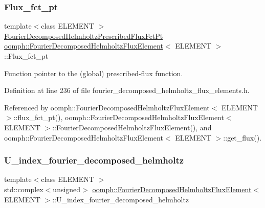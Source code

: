 \subsubsection{\texorpdfstring{Flux\+\_\+fct\+\_\+pt}{Flux\_fct\_pt}}
{\footnotesize\ttfamily template$<$class E\+L\+E\+M\+E\+NT $>$ \\
\hyperlink{classoomph_1_1FourierDecomposedHelmholtzFluxElement_af230a2a3a16a1fd0a48a2681dc94c1e8}{Fourier\+Decomposed\+Helmholtz\+Prescribed\+Flux\+Fct\+Pt} \hyperlink{classoomph_1_1FourierDecomposedHelmholtzFluxElement}{oomph\+::\+Fourier\+Decomposed\+Helmholtz\+Flux\+Element}$<$ E\+L\+E\+M\+E\+NT $>$\+::Flux\+\_\+fct\+\_\+pt\hspace{0.3cm}{\ttfamily [protected]}}



Function pointer to the (global) prescribed-\/flux function. 



Definition at line 236 of file fourier\+\_\+decomposed\+\_\+helmholtz\+\_\+flux\+\_\+elements.\+h.



Referenced by oomph\+::\+Fourier\+Decomposed\+Helmholtz\+Flux\+Element$<$ E\+L\+E\+M\+E\+N\+T $>$\+::flux\+\_\+fct\+\_\+pt(), oomph\+::\+Fourier\+Decomposed\+Helmholtz\+Flux\+Element$<$ E\+L\+E\+M\+E\+N\+T $>$\+::\+Fourier\+Decomposed\+Helmholtz\+Flux\+Element(), and oomph\+::\+Fourier\+Decomposed\+Helmholtz\+Flux\+Element$<$ E\+L\+E\+M\+E\+N\+T $>$\+::get\+\_\+flux().

\mbox{\label{classoomph_1_1FourierDecomposedHelmholtzFluxElement_ad4145847e04e141392e48b217ddb9125}} 
\subsubsection{\texorpdfstring{U\+\_\+index\+\_\+fourier\+\_\+decomposed\+\_\+helmholtz}{U\_index\_fourier\_decomposed\_helmholtz}}
{\footnotesize\ttfamily template$<$class E\+L\+E\+M\+E\+NT $>$ \\
std\+::complex$<$unsigned$>$ \hyperlink{classoomph_1_1FourierDecomposedHelmholtzFluxElement}{oomph\+::\+Fourier\+Decomposed\+Helmholtz\+Flux\+Element}$<$ E\+L\+E\+M\+E\+NT $>$\+::U\+\_\+index\+\_\+fourier\+\_\+decomposed\+\_\+helmholtz\hspace{0.3cm}{\ttfamily [protected]}}




